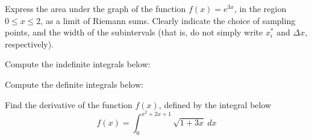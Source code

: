 \documentclass[11pt]{exam}
\begin{document}
%
%
%

\begin{questions}



\addpoints
\question[2] Express the area under the graph of the function $f(x)=e^{3x}$, in the region $0 \leq x \leq 2$, as a limit of Riemann sums. Clearly indicate the choice of sampling points, and the width of the subintervals (that is, do not simply write $x_{i}^{*}$ and $\Delta x$, respectively). 

\newpage

\addpoints
\question Compute the indefinite integrals below:
\newpage

\addpoints
\question Compute the definite integrals below: 
\newpage
\addpoints

\question[4] Find the derivative of the function $f(x)$, defined by the integral below
\begin{equation*}
f(x)=\int_{0}^{x^2+2x+1} \sqrt{1+3x} \ dx
\end{equation*}

\addpoints
\end{questions}
\end{document}
